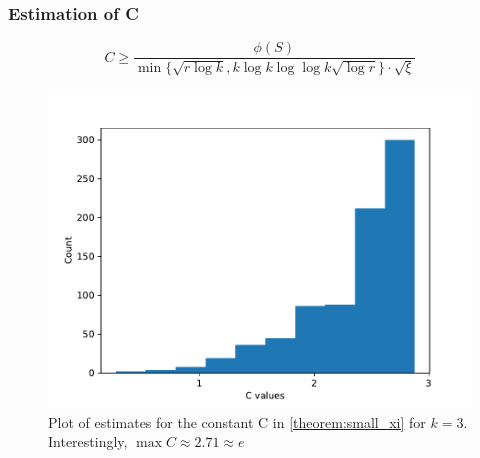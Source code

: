 \documentclass{beamer}
\begin{document}
\begin{frame}
\frametitle{Estimation of C}
	\begin{equation} \label{eq:c_estimate}
	C\ge \frac {\phi(S)}{ \min\{\sqrt{r \log k}, k \log k  \log \log k \sqrt{\log r} \} \cdot \sqrt{\xi}}
	\end{equation}
	
	\begin{figure}
		\centering
		\includegraphics[scale=0.4]{figures/quality_evaluation_log_C_estimates.pdf}
		\caption[Plot C estimates]{Plot of estimates for the constant C in \cref{theorem:small_xi} for $k=3$. Interestingly, $\max C \approx 2.71 \approx e$\label{fig:c_estimates} }
	\end{figure}
	
\end{frame}
\end{document}
